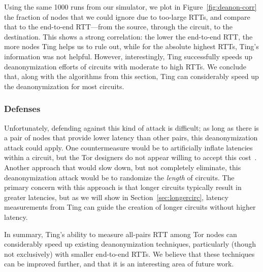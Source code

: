Using the same 1000 runs from our simulator, we plot in
Figure~\ref{fig:deanon-corr} the fraction of nodes that we could ignore
due to too-large RTTs, and compare that to the end-to-end RTT---from
the source, through the circuit, to the destination.
%
This shows a strong correlation: the lower the end-to-end RTT, the more
nodes Ting helps us to rule out, while for the absolute highest RTTs,
Ting's information was not helpful.
%
However, interestingly, Ting successfully speeds up deanonymization
efforts of circuits with moderate to high RTTs.
%
We conclude that, along with the algorithms from this section, Ting can
considerably speed up the deanonymization for most circuits.

%
%




\subsubsection{Defenses} %

Unfortunately, defending against this kind of attack is difficult; as
long as there is a pair of nodes that provide lower latency than other
pairs, this deanonymization attack could apply.
%
One countermeasure would be to artificially inflate latencies within a
circuit, but the Tor designers do not appear willing to accept this
cost~\cite{tor}. 
%
Another approach that would slow down, but not completely eliminate,
this deanonymization attack would be to randomize the \emph{length} of
circuits.
%
The primary concern with this approach is that longer circuits
typically result in greater latencies, but as we will show in
Section~\ref{sec:longercirc}, latency measurements from Ting can guide
the creation of longer circuits without higher latency.

\medskip

\noindent
In summary, Ting's ability to measure all-pairs RTT among Tor nodes can
considerably speed up existing deanonymization techniques, particularly
(though not exclusively) with smaller end-to-end RTTs.
%
We believe that these techniques can be improved further, and that it is
an interesting area of future work.


